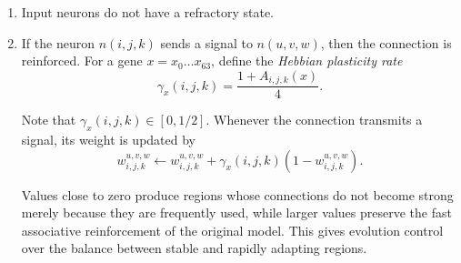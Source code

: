 \documentclass[12pt,a4paper]{article}
\begin{document}
\begin{enumerate}
\begin{figure}[H]

		\caption{\footnotesize{Order of the refractory-state update within one simulation iteration. The current fatigue determines the effective threshold. If the neuron fires, it sends a signal and its fatigue is reset to the genetically determined maximum value $\rho_{\max}(x)=F_{0.4}(x)$. Otherwise, the fatigue is reduced by half.}}
		\label{fig:refractory_process}
	\end{figure}

	\item Input neurons do not have a refractory state.
	
	\item If the neuron $n(i,j,k)$ sends a signal to $n(u,v,w)$, then the connection is reinforced. For a gene $x=x_0\ldots x_{63}$, define the \emph{Hebbian plasticity rate}
	$$\gamma_x(i,j,k)=\frac{1 + A_{i,j,k}(x)}{4}.$$
	
	Note that $\gamma_x(i,j,k)\in[0,1/2]$. Whenever the connection transmits a signal, its weight is updated by
	$$w_{i,j,k}^{u,v,w}\leftarrow w_{i,j,k}^{u,v,w}+\gamma_x(i,j,k)\left(1-w_{i,j,k}^{u,v,w}\right).$$
	
	Values close to zero produce regions whose connections do not become strong merely because they are frequently used, while larger values preserve the fast associative reinforcement of the original model. This gives evolution control over the balance between stable and rapidly adapting regions.
	

\end{enumerate}
\end{document}
